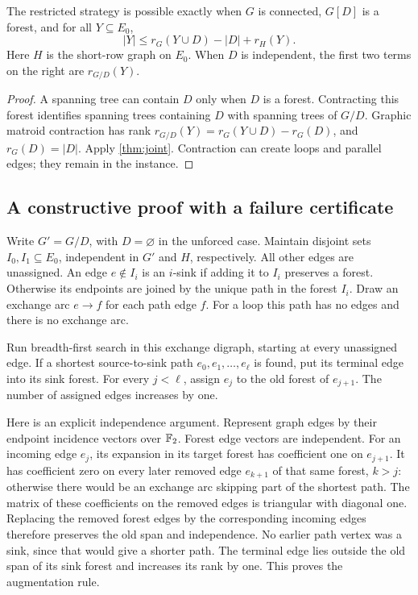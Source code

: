 \begin{corollary}
\label{cor:forced}
The restricted strategy is possible exactly when $G$ is connected,
$G[D]$ is a forest, and for all $Y\subseteq E_0$,
\begin{equation}
 |Y|\leq r_G(Y\cup D)-|D|+r_H(Y).
 \label{eq:forced-rank}
\end{equation}
Here $H$ is the short-row graph on $E_0$. When $D$ is independent, the first
two terms on the right are $r_{G/D}(Y)$.
\end{corollary}

\begin{proof}
A spanning tree can contain $D$ only when $D$ is a forest. Contracting this
forest identifies spanning trees containing $D$ with spanning trees of
$G/D$. Graphic matroid contraction has rank
$r_{G/D}(Y)=r_G(Y\cup D)-r_G(D)$, and $r_G(D)=|D|$.
Apply \cref{thm:joint}. Contraction can create loops and parallel edges;
they remain in the instance.
\end{proof}

\subsection{A constructive proof with a failure certificate}
\label{sec:augment}

Write $G'=G/D$, with $D=\varnothing$ in the unforced case. Maintain
disjoint sets $I_0,I_1\subseteq E_0$, independent in $G'$ and $H$,
respectively. All other edges are unassigned. An edge $e\notin I_i$ is an
$i$-sink if adding it to $I_i$ preserves a forest. Otherwise its endpoints
are joined by the unique path in the forest $I_i$. Draw an exchange arc
$e\to f$ for each path edge $f$. For a loop this path has no edges and
there is no exchange arc.

Run breadth-first search in this exchange digraph, starting at every
unassigned edge. If a shortest source-to-sink path
$e_0,e_1,\ldots,e_\ell$ is found, put its terminal edge into its sink
forest. For every $j<\ell$, assign $e_j$ to the old forest of
$e_{j+1}$. The number of assigned edges increases by one.

Here is an explicit independence argument. Represent graph edges by their
endpoint incidence vectors over $\mathbb F_2$. Forest edge vectors are independent.
For an incoming edge $e_j$, its expansion in its target forest has
coefficient one on $e_{j+1}$. It has coefficient zero on every later
removed edge $e_{k+1}$ of that same forest, $k>j$: otherwise there would be
an exchange arc skipping part of the shortest path. The matrix of these
coefficients on the removed edges is triangular with diagonal one.
Replacing the removed forest edges by the corresponding incoming edges
therefore preserves the old span and independence. No earlier path vertex
was a sink, since that would give a shorter path. The terminal edge lies
outside the old span of its sink forest and increases its rank by one.
This proves the augmentation rule.

